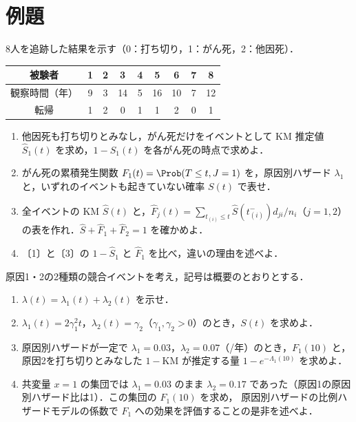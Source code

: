 \section{例題}\label{sec:m05-reidai}
\begin{reidai}\label{reidai:m05-1}
8人を追跡した結果を示す（0：打ち切り，1：がん死，2：他因死）．
\begin{center}\small
\begin{tabular}{@{}ccccccccc@{}}
\toprule
被験者 & 1 & 2 & 3 & 4 & 5 & 6 & 7 & 8\\
\midrule
観察時間（年） & 9 & 3 & 14 & 5 & 16 & 10 & 7 & 12\\
転帰 & 1 & 2 & 0 & 1 & 1 & 2 & 0 & 1\\
\bottomrule
\end{tabular}
\end{center}
\begin{enumerate}[label=〔\arabic*〕]
\item 他因死も打ち切りとみなし，がん死だけをイベントとして KM 推定値 $\hat S_1(t)$ を求め，$1-\hat S_1(t)$ を各がん死の時点で求めよ．
\item がん死の累積発生関数 $F_1(t)=\Prob(T\le t,J=1)$ を，原因別ハザード $\lambda_1$ と，いずれのイベントも起きていない確率 $S(t)$ で表せ．
\item 全イベントの KM $\hat S(t)$ と，$\hat F_j(t)=\sum_{t_{(i)}\le t}\hat S(t_{(i)}^-)d_{ji}/n_i$（$j=1,2$）の表を作れ．$\hat S+\hat F_1+\hat F_2=1$ を確かめよ．
\item 〔1〕と〔3〕の $1-\hat S_1$ と $\hat F_1$ を比べ，違いの理由を述べよ．
\end{enumerate}
\end{reidai}

\begin{reidai}\label{reidai:m05-2}
原因1・2の2種類の競合イベントを考え，記号は概要のとおりとする．
\begin{enumerate}[label=〔\arabic*〕]
\item $\lambda(t)=\lambda_1(t)+\lambda_2(t)$ を示せ．
\item $\lambda_1(t)=2\gamma_1^2t$，$\lambda_2(t)=\gamma_2$（$\gamma_1,\gamma_2>0$）のとき，$S(t)$ を求めよ．
\item 原因別ハザードが一定で $\lambda_1=0.03$，$\lambda_2=0.07$（/年）のとき，$F_1(10)$ と，原因2を打ち切りとみなした $1-\mathrm{KM}$ が推定する量 $1-e^{-\Lambda_1(10)}$ を求めよ．
\item 共変量 $x=1$ の集団では $\lambda_1=0.03$ のまま $\lambda_2=0.17$ であった（原因1の原因別ハザード比は1）．この集団の $F_1(10)$ を求め，
      原因別ハザードの比例ハザードモデルの係数で $F_1$ への効果を評価することの是非を述べよ．
\end{enumerate}
\end{reidai}

